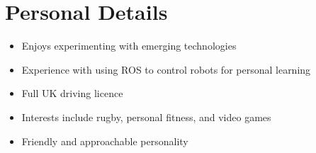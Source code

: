 \documentclass[10pt]{article}
\begin{document}
\section*{Personal Details}
\begin{itemize}[noitemsep,topsep=0pt]
    \item Enjoys experimenting with emerging technologies
    \item Experience with using ROS to control robots for personal learning
	\item Full UK driving licence
	\item Interests include rugby, personal fitness, and video games
	\item Friendly and approachable personality
\end{itemize}
\end{document}
